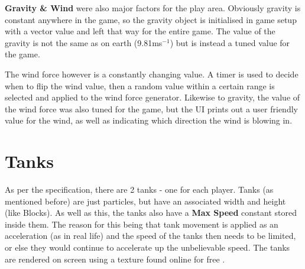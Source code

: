 \documentclass[12pt]{article}
\begin{document}
\par 
\textbf{Gravity \& Wind} were also major factors for the play area. Obviously gravity is constant anywhere in the game, so the gravity object is initialised in game setup with a vector value and left that way for the entire game. The value of the gravity is not the same as on earth (9.81ms$^{-1}$) but is instead a tuned value for the game. 
\par 
The wind force however is a constantly changing value. A timer is used to decide when to flip the wind value, then a random value within a certain range is selected and applied to the wind force generator. Likewise to gravity, the value of the wind force was also tuned for the game, but the UI prints out a user friendly value for the wind, as well as indicating which direction the wind is blowing in.
\section{Tanks}
As per the specification, there are 2 tanks - one for each player. Tanks (as mentioned before) are just particles, but have an associated width and height (like Blocks). As well as this, the tanks also have a \textbf{Max Speed} constant stored inside them. The reason for this being that tank movement is applied as an acceleration (as in real life) and the speed of the tanks then needs to be limited, or else they would continue to accelerate up the unbelievable speed. The tanks are rendered on screen using a texture found online for free \cite{tankTextures}.
\end{document}
